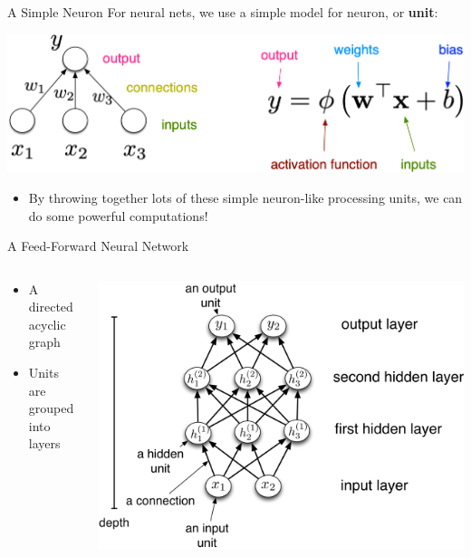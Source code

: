\documentclass[11pt,handout,aspectratio=169]{beamer}
\begin{document}
\begin{frame}{A Simple Neuron}
For neural nets, we use a simple model for neuron, or \textbf{unit}:

    \begin{center}
      \includegraphics[width=0.8 \textwidth]{pics/neuron2}
    \end{center}
\pause
  \begin{itemize}

  \item By throwing together lots of these simple neuron-like processing units, we can do some powerful computations!
  \end{itemize}
\end{frame}



\begin{frame}{A Feed-Forward Neural Network}
\vspace{5mm}
  \begin{columns}
    \begin{column}{0.45 \linewidth}
      \begin{itemize}
      \item A \alert{directed acyclic graph}
      \item Units are grouped into \alert{layers}
      \end{itemize}
    \end{column}
    \begin{column}{0.65 \linewidth}
      \includegraphics[width=\linewidth]{pics/mlp.png}
    \end{column}
  \end{columns}
\end{frame}
\end{document}
